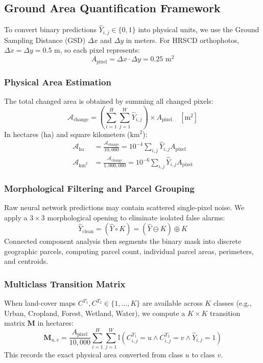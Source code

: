 \documentclass[final,5p,times,twocolumn]{elsarticle}
\begin{document}
\subsection{Ground Area Quantification Framework}
\label{sec:area_calc}
To convert binary predictions $\hat{Y}_{i,j} \in \{0, 1\}$ into physical units, we use the Ground Sampling Distance (GSD) $\Delta x$ and $\Delta y$ in meters. For HRSCD orthophotos, $\Delta x = \Delta y = 0.5\text{ m}$, so each pixel represents:
\begin{equation}
    A_{\text{pixel}} = \Delta x \cdot \Delta y = 0.25\text{ m}^2
\end{equation}

\subsubsection{Physical Area Estimation}
The total changed area is obtained by summing all changed pixels:
\begin{equation}
    \mathcal{A}_{\text{change}} = \left(\sum_{i=1}^{H}\sum_{j=1}^{W} \hat{Y}_{i,j}\right) \times A_{\text{pixel}} \quad [\text{m}^2]
\end{equation}
In hectares ($\text{ha}$) and square kilometers ($\text{km}^2$):
\begin{align}
    \mathcal{A}_{\text{ha}} &= \frac{\mathcal{A}_{\text{change}}}{10{,}000} = 10^{-4} \sum_{i,j} \hat{Y}_{i,j} A_{\text{pixel}} \\
    \mathcal{A}_{\text{km}^2} &= \frac{\mathcal{A}_{\text{change}}}{1{,}000{,}000} = 10^{-6} \sum_{i,j} \hat{Y}_{i,j} A_{\text{pixel}}
\end{align}

\subsubsection{Morphological Filtering and Parcel Grouping}
Raw neural network predictions may contain scattered single-pixel noise. We apply a $3\times3$ morphological opening to eliminate isolated false alarms:
\begin{equation}
    \hat{Y}_{\text{clean}} = (\hat{Y} \circ K) = (\hat{Y} \ominus K) \oplus K
\end{equation}
Connected component analysis then segments the binary mask into discrete geographic parcels, computing parcel count, individual parcel areas, perimeters, and centroids.

\subsubsection{Multiclass Transition Matrix}
When land-cover maps $C^{T_1}, C^{T_2} \in \{1, \dots, K\}$ are available across $K$ classes (e.g., Urban, Cropland, Forest, Wetland, Water), we compute a $K \times K$ transition matrix $\mathbf{M}$ in hectares:
\begin{equation}
    \mathbf{M}_{u,v} = \frac{A_{\text{pixel}}}{10{,}000} \sum_{i=1}^H \sum_{j=1}^W \mathbb{I}\left(C^{T_1}_{i,j} = u \land C^{T_2}_{i,j} = v \land \hat{Y}_{i,j} = 1\right)
\end{equation}
This records the exact physical area converted from class $u$ to class $v$.
\end{document}
